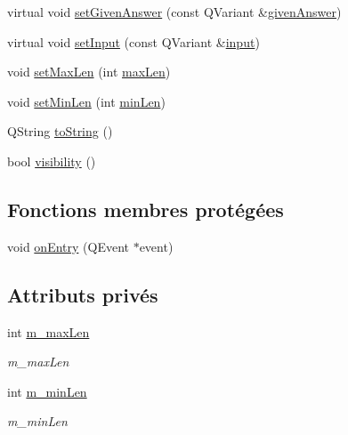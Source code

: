 \begin{DoxyCompactItemize}
virtual void \hyperlink{classSimpleHotel_1_1SH__QuestionState_aeb4464741ecd13b283c504def63dd619}{set\-Given\-Answer} (const Q\-Variant \&\hyperlink{classSimpleHotel_1_1SH__QuestionState_a243f09bc1f822af7748edb038ac2957c}{given\-Answer})
\item 
virtual void \hyperlink{classSimpleHotel_1_1SH__QuestionState_ae404d8874e542fd5f3e6d658f003bae4}{set\-Input} (const Q\-Variant \&\hyperlink{classSimpleHotel_1_1SH__InOutState_a487d2ca6200fed372b1a27cfa27774db}{input})
\item 
void \hyperlink{classSimpleHotel_1_1SH__StringQuestionState_add76bb81ad6095e3445e843c460c351e}{set\-Max\-Len} (int \hyperlink{classSimpleHotel_1_1SH__StringQuestionState_a0e6c288a9af0b8d48238b24a07021457}{max\-Len})
\item 
void \hyperlink{classSimpleHotel_1_1SH__StringQuestionState_a391cd56671790f9553cd99aa5bef5f50}{set\-Min\-Len} (int \hyperlink{classSimpleHotel_1_1SH__StringQuestionState_abe581cfd2fc9591effad3f07b33544a1}{min\-Len})
\item 
Q\-String \hyperlink{classSimpleHotel_1_1SH__GenericState_adaded78178f9999a9e07a32871af5e61}{to\-String} ()
\item 
bool \hyperlink{classSimpleHotel_1_1SH__InOutState_a145a6e0e2c9e22971e35aa4538adeb4a}{visibility} ()
\end{DoxyCompactItemize}
\subsection*{Fonctions membres protégées}
\begin{DoxyCompactItemize}
\item 
void \hyperlink{classSimpleHotel_1_1SH__GenericState_adebdb330ff20556a54a833b15e50eacc}{on\-Entry} (Q\-Event $\ast$event)
\end{DoxyCompactItemize}
\subsection*{Attributs privés}
\begin{DoxyCompactItemize}
\item 
int \hyperlink{classSimpleHotel_1_1SH__StringQuestionState_a536f87fad8a2f7f4edc314d34ba2c82b}{m\-\_\-max\-Len}
\begin{DoxyCompactList}\small\item\em m\-\_\-max\-Len \end{DoxyCompactList}\item 
int \hyperlink{classSimpleHotel_1_1SH__StringQuestionState_a69ae39a696138f6078705509b0dbfa88}{m\-\_\-min\-Len}
\begin{DoxyCompactList}\small\item\em m\-\_\-min\-Len \end{DoxyCompactList}\end{DoxyCompactItemize}



